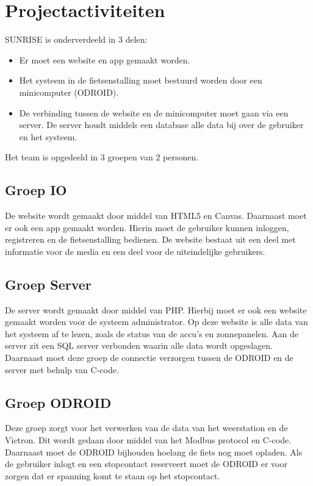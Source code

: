 \section{Projectactiviteiten}

SUNRISE is onderverdeeld in 3 delen: 

\begin{itemize}
\item Er moet een website en app gemaakt worden.
\item Het systeem in de fietsenstalling moet bestuurd worden door een minicomputer (ODROID).
\item De verbinding tussen de website en de minicomputer moet gaan via een server. De server houdt middels een database alle data bij over de gebruiker en het systeem.


\end{itemize}
\noindent
Het team is opgedeeld in 3 groepen van 2 personen.\\

\subsection{Groep IO}
De website wordt gemaakt door middel van HTML5 en Canvas. Daarnaast moet er ook een app gemaakt worden. Hierin moet de gebruiker kunnen inloggen, registreren en de fietsenstalling bedienen. De website bestaat uit een deel met informatie voor de media en een deel voor de uiteindelijke gebruikers.

\subsection{Groep Server}
De server wordt gemaakt door middel van PHP. Hierbij moet er ook een website gemaakt worden voor de systeem administrator. Op deze website is alle data van het systeem af te lezen, zoals de status van de accu's en zonnepanelen. Aan de server zit een SQL server verbonden waarin alle data wordt opgeslagen. Daarnaast moet deze groep de connectie verzorgen tussen de ODROID en de server met behulp van C-code.

\subsection{Groep ODROID}
Deze groep zorgt voor het verwerken van de data van het weerstation en de Victron. Dit wordt gedaan door middel van het Modbus protocol en C-code. Daarnaast moet de ODROID bijhouden hoelang de fiets nog moet opladen. Als de gebruiker inlogt en een stopcontact reserveert moet de ODROID er voor zorgen dat er spanning komt te staan op het stopcontact.\\

